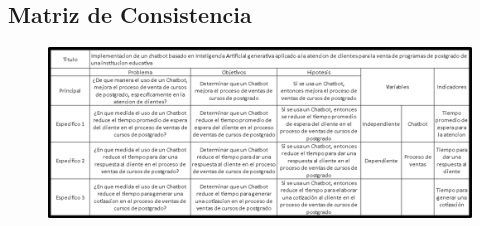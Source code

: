 \documentclass[10pt,a4paper]{article}
\begin{document}

    \subsection{Matriz de Consistencia} 
	
	\begin{figure}[H]
		\includegraphics[scale=0.5]{MatrizConsistencia.png} \hfill 
	\end{figure}
	
\end{document}
